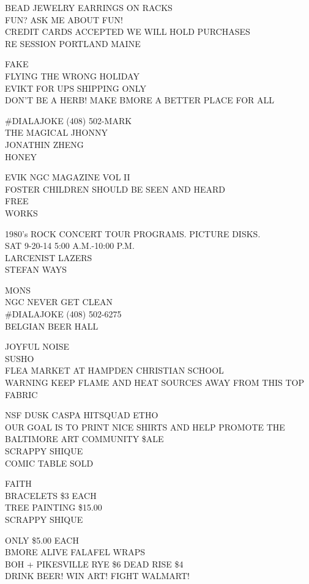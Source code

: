 \documentclass[10pt,letterpaper]{article}
\begin{document}
BEAD JEWELRY EARRINGS ON RACKS\\
FUN?  ASK ME ABOUT FUN!\\
CREDIT CARDS ACCEPTED WE WILL HOLD PURCHASES\\
RE SESSION PORTLAND MAINE

FAKE\\
FLYING THE WRONG HOLIDAY\\
EVIKT FOR UPS SHIPPING ONLY\\
DON'T BE A HERB!  MAKE BMORE A BETTER PLACE FOR ALL

\#DIALAJOKE (408) 502{-}MARK\\
THE MAGICAL JHONNY\\
JONATHIN ZHENG\\
HONEY

EVIK NGC MAGAZINE VOL II\\
FOSTER CHILDREN SHOULD BE SEEN AND HEARD\\
FREE\\
WORKS

1980's ROCK CONCERT TOUR PROGRAMS.  PICTURE DISKS.\\
SAT 9{-}20{-}14 5:00 A.M.{-}10:00 P.M.\\
LARCENIST LAZERS\\
STEFAN WAYS

MONS\\
NGC NEVER GET CLEAN\\
\#DIALAJOKE (408) 502{-}6275\\
BELGIAN BEER HALL

JOYFUL NOISE\\
SUSHO\\
FLEA MARKET AT HAMPDEN CHRISTIAN SCHOOL\\
WARNING KEEP FLAME AND HEAT SOURCES AWAY FROM THIS TOP FABRIC

NSF DUSK CASPA HITSQUAD ETHO\\
OUR GOAL IS TO PRINT NICE SHIRTS AND HELP PROMOTE THE BALTIMORE ART COMMUNITY \$ALE\\
SCRAPPY SHIQUE\\
COMIC TABLE SOLD

FAITH\\
BRACELETS \$3 EACH\\
TREE PAINTING \$15.00\\
SCRAPPY SHIQUE

ONLY \$5.00 EACH\\
BMORE ALIVE FALAFEL WRAPS\\
BOH + PIKESVILLE RYE \$6 DEAD RISE \$4\\
DRINK BEER! WIN ART! FIGHT WALMART!
\end{document}
